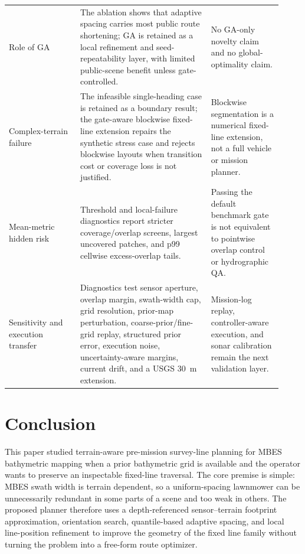 \documentclass[jmse,article,submit,moreauthors]{Definitions/mdpi}
\begin{document}
\begin{table}[!htbp]
\begin{tabular}{@{}>{\raggedright\arraybackslash}p{0.24\linewidth}>{\raggedright\arraybackslash}p{0.44\linewidth}>{\raggedright\arraybackslash}p{0.24\linewidth}@{}}
		Role of GA & The ablation shows that adaptive spacing carries most public route shortening; GA is retained as a local refinement and seed-repeatability layer, with limited public-scene benefit unless gate-controlled. & No GA-only novelty claim and no global-optimality claim. \\
		Complex-terrain failure & The infeasible single-heading case is retained as a boundary result; the gate-aware blockwise fixed-line extension repairs the synthetic stress case and rejects blockwise layouts when transition cost or coverage loss is not justified. & Blockwise segmentation is a numerical fixed-line extension, not a full vehicle or mission planner. \\
		Mean-metric hidden risk & Threshold and local-failure diagnostics report stricter coverage/overlap screens, largest uncovered patches, and p99 cellwise excess-overlap tails. & Passing the default benchmark gate is not equivalent to pointwise overlap control or hydrographic QA. \\
		Sensitivity and execution transfer & Diagnostics test sensor aperture, overlap margin, swath-width cap, grid resolution, prior-map perturbation, coarse-prior/fine-grid replay, structured prior error, execution noise, uncertainty-aware margins, current drift, and a USGS 30~m extension. & Mission-log replay, controller-aware execution, and sonar calibration remain the next validation layer. \\
		\bottomrule[1bp]
	\end{tabular}
\end{table}

\section{Conclusion}
\label{sec:conclusion}
This paper studied terrain-aware pre-mission survey-line planning for MBES bathymetric mapping when a prior bathymetric grid is available and the operator wants to preserve an inspectable fixed-line traversal. The core premise is simple: MBES swath width is terrain dependent, so a uniform-spacing lawnmower can be unnecessarily redundant in some parts of a scene and too weak in others. The proposed planner therefore uses a depth-referenced sensor--terrain footprint approximation, orientation search, quantile-based adaptive spacing, and local line-position refinement to improve the geometry of the fixed line family without turning the problem into a free-form route optimizer.
\end{document}
